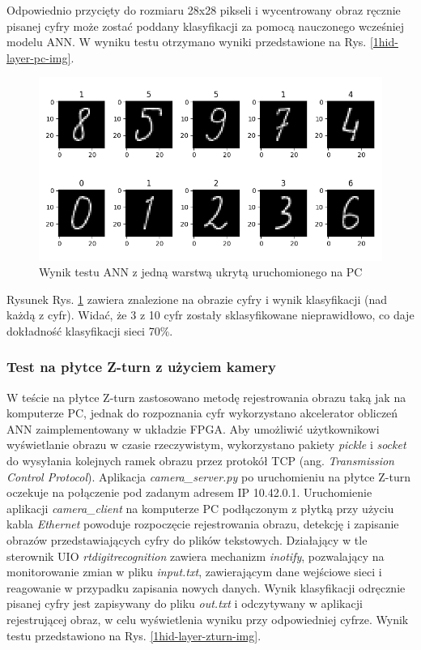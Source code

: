 Odpowiednio przycięty do rozmiaru 28x28 pikseli i wycentrowany obraz ręcznie pisanej cyfry może 
zostać poddany klasyfikacji za pomocą nauczonego wcześniej modelu ANN. W wyniku testu otrzymano 
wyniki przedstawione na Rys. \ref{1hid-layer-pc-img}. 

\begin{figure}[!h]
    \centering
    \includegraphics[width=\textwidth]{img/1hid-layer-pc-plot.png}
    \caption{Wynik testu ANN z jedną warstwą ukrytą uruchomionego na PC}
    \label{1hid-layer-pc-plot}
\end{figure}


Rysunek Rys. \ref{1hid-layer-pc-plot} zawiera znalezione na obrazie cyfry i wynik klasyfikacji (nad 
każdą z cyfr). Widać, że 3 z 10 cyfr zostały sklasyfikowane nieprawidłowo, co daje dokładność 
klasyfikacji sieci 70\%.

\subsubsection{Test na płytce Z-turn z użyciem kamery}

W teście na płytce Z-turn zastosowano metodę rejestrowania obrazu taką jak na komputerze PC, jednak 
do rozpoznania cyfr wykorzystano akcelerator obliczeń ANN zaimplementowany w układzie FPGA.  
Aby umożliwić użytkownikowi wyświetlanie obrazu w czasie rzeczywistym, wykorzystano pakiety \emph{pickle} i \emph{socket} do wysyłania kolejnych ramek obrazu przez protokół TCP (ang. \emph{Transmission Control Protocol}). Aplikacja \emph{camera\_server.py} po uruchomieniu na płytce Z-turn oczekuje na połączenie pod zadanym adresem IP 10.42.0.1. Uruchomienie aplikacji \emph{camera\_client} na komputerze PC podłączonym z płytką przy użyciu kabla \emph{Ethernet} powoduje rozpoczęcie rejestrowania obrazu, detekcję i zapisanie obrazów przedstawiających cyfry do plików tekstowych. Działający w tle sterownik UIO \emph{rtdigitrecognition} zawiera mechanizm \emph{inotify}, pozwalający na monitorowanie zmian w pliku \emph{input.txt}, zawierającym dane wejściowe sieci i reagowanie w przypadku zapisania nowych danych. Wynik klasyfikacji odręcznie pisanej cyfry jest zapisywany do pliku \emph{out.txt} i odczytywany w aplikacji rejestrującej obraz, w celu wyświetlenia wyniku przy odpowiedniej cyfrze. Wynik testu przedstawiono na Rys. \ref{1hid-layer-zturn-img}.

